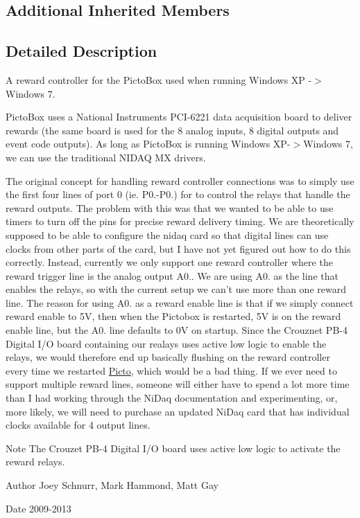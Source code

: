 \subsection*{Additional Inherited Members}


\subsection{Detailed Description}
A reward controller for the Picto\-Box used when running Windows X\-P -\/$>$ Windows 7. 

Picto\-Box uses a National Instruments P\-C\-I-\/6221 data acquisition board to deliver rewards (the same board is used for the 8 analog inputs, 8 digital outputs and event code outputs). As long as Picto\-Box is running Windows X\-P-\/$>$Windows 7, we can use the traditional N\-I\-D\-A\-Q M\-X drivers.

The original concept for handling reward controller connections was to simply use the first four lines of port 0 (ie. P0.-\/\-P0.) for to control the relays that handle the reward outputs. The problem with this was that we wanted to be able to use timers to turn off the pins for precise reward delivery timing. We are theoretically supposed to be able to configure the nidaq card so that digital lines can use clocks from other parts of the card, but I have not yet figured out how to do this correctly. Instead, currently we only support one reward controller where the reward trigger line is the analog output A0.. We are using A0. as the line that enables the relays, so with the current setup we can't use more than one reward line. The reason for using A0. as a reward enable line is that if we simply connect reward enable to 5\-V, then when the Pictobox is restarted, 5\-V is on the reward enable line, but the A0. line defaults to 0\-V on startup. Since the Crouznet P\-B-\/4 Digital I/\-O board containing our realays uses active low logic to enable the relays, we would therefore end up basically flushing on the reward controller every time we restarted \hyperlink{namespace_picto}{Picto}, which would be a bad thing. If we ever need to support multiple reward lines, someone will either have to spend a lot more time than I had working through the Ni\-Daq documentation and experimenting, or, more likely, we will need to purchase an updated Ni\-Daq card that has individual clocks available for 4 output lines.

\begin{DoxyNote}{Note}
The Crouzet P\-B-\/4 Digital I/\-O board uses active low logic to activate the reward relays. 
\end{DoxyNote}
\begin{DoxyAuthor}{Author}
Joey Schnurr, Mark Hammond, Matt Gay 
\end{DoxyAuthor}
\begin{DoxyDate}{Date}
2009-\/2013 
\end{DoxyDate}


